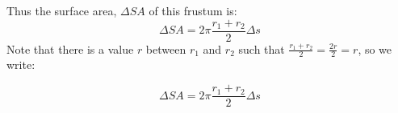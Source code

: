 \documentclass{ximera}
\begin{document}
%
%
%
%
%
%    









Thus the surface area, $\Delta SA$ of this frustum is:
\[
\Delta SA = 2\pi\frac{r_1+r_2}{2} \Delta s
\]
Note that there is a value $r$ between $r_1$ and $r_2$ such that $\frac{r_1+r_2}{2} = \frac{2r}{2} = r$, so we write: 

\[
\Delta SA = 2\pi\frac{r_1+r_2}{2} \Delta s
\]
\end{document}
